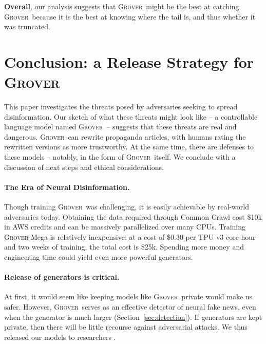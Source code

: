 \documentclass{article}
\newcommand{\modelname}{{\textsc{Grover}}}
\begin{document}
\textbf{Overall}, our analysis suggests that \modelname~might be the best at catching \modelname~because it is the best at knowing where the tail is, and thus whether it was truncated.


















 


\section{Conclusion: a Release Strategy for \modelname}
This paper investigates the threats posed by adversaries seeking to spread disinformation. Our sketch of what these threats might look like -- a controllable language model named \modelname~-- suggests that these threats are real and dangerous. \modelname~can rewrite propaganda articles, with humans rating the rewritten versions as more trustworthy. At the same time, there are defenses to these models -- notably, in the form of \modelname~itself. We conclude with a discussion of next steps and ethical considerations. 


\paragraph{The Era of Neural Disinformation.} Though training \modelname~was challenging, it is easily achievable by real-world adversaries today. Obtaining the data required through Common Crawl cost \$10k in AWS credits and can be massively parallelized over many CPUs. Training \modelname-Mega is relatively inexpensive: at a cost of \$0.30 per TPU v3 core-hour and two weeks of training, the total cost is \$25k. Spending more money and engineering time could yield even more powerful generators.

\paragraph{Release of generators is critical.} At first, it would seem like keeping models like \modelname~private would make us safer. However, \modelname~serves as an effective detector of neural fake news, even when the generator is much larger (Section~\ref{sec:detection}). If generators are kept private, then there will be little recourse against adversarial attacks. We thus released our models to researchers \citep{zellers2019whywereleasedgrover}.
\end{document}

